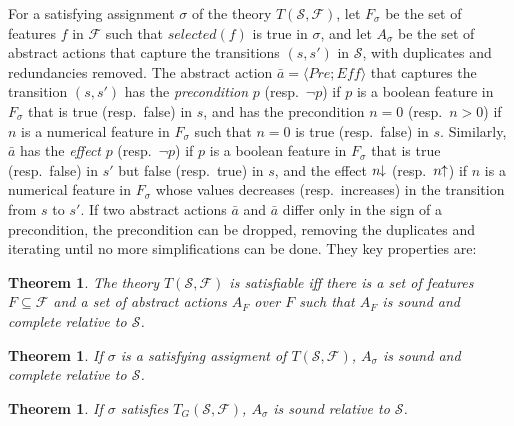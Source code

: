 \documentclass[letterpaper]{article} %
\newcommand{\tup}[1]{\langle #1 \rangle}
\newtheorem{theorem}[definition]{Theorem}
\newcommand{\F}{\mathcal{F}}
\renewcommand{\S}{\mathcal{S}}
\newcommand{\Eff}{{\mathit{Eff}}}
\newcommand{\abst}[2]{\tup{#1;#2}}
\newcommand{\pplus}{\hspace{-.05em}\raisebox{.15ex}{\footnotesize$\uparrow$}}
\newcommand{\mminus}{\hspace{-.05em}\raisebox{.15ex}{\footnotesize$\downarrow$}}
\begin{document}
For a satisfying assignment $\sigma$ of the theory $T(\S,\F)$, let
$F_{\sigma}$ be the set of features $f$ in $\F$ such that $selected(f)$
is true in $\sigma$, and let $A_{\sigma}$ be the set of abstract actions
that capture the transitions $(s,s')$ in $\S$, with duplicates and redundancies removed.
The abstract action $\bar{a}=\abst{Pre}{\Eff}$ that captures the transition $(s,s')$
has the \emph{precondition} $p$ (resp.\ $\neg p$) if $p$ is a boolean feature in
$F_{\sigma}$ that is true (resp.\ false) in $s$, and has the precondition $n=0$
(resp.\ $n > 0$) if $n$ is a numerical feature in $F_{\sigma}$ such that $n=0$
is true (resp.\ false) in $s$. Similarly, $\bar{a}$ has the \emph{effect} $p$
(resp.\ $\neg p$) if $p$ is a boolean feature in $F_{\sigma}$ that is true
(resp.\ false) in $s'$ but false (resp.\ true) in $s$, and the effect $n\mminus$
(resp.\ $n\pplus$) if $n$ is a numerical feature in $F_{\sigma}$ whose values
decreases (resp.\ increases) in the transition from $s$ to $s'$. 
If two abstract actions $\bar{a}$ and $\bar{a}$ differ only in the sign of a
precondition, the precondition can be dropped, removing the duplicates and
iterating until no more simplifications can be done. They key properties are:

\begin{theorem}
  The theory $T(\S,\F)$ is satisfiable iff there is a set of features $F \subseteq \F$
  and a set of abstract actions $A_F$ over $F$ such that $A_F$ is sound and complete relative to  $\S$.
\end{theorem}

\begin{theorem}
  If $\sigma$ is a satisfying assigment of $T(\S,\F)$, 
  $A_{\sigma}$ is sound and complete relative to $\S$.
\end{theorem}

\begin{theorem}
  If $\sigma$ satisfies  $T_G(\S,\F)$, $A_{\sigma}$  is sound relative to $\S$.
\end{theorem}
\end{document}
